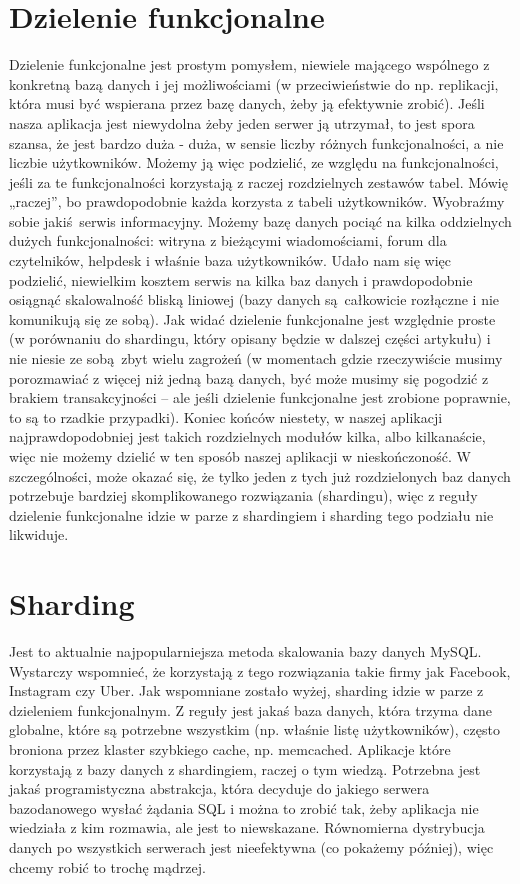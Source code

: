 \documentclass[a4paper,12pt]{article}
\begin{document}
\section{Dzielenie funkcjonalne}
Dzielenie funkcjonalne jest prostym pomysłem, niewiele mającego wspólnego z konkretną bazą danych i jej możliwościami (w przeciwieństwie do np. replikacji, która musi być wspierana przez bazę danych, żeby ją efektywnie zrobić). Jeśli nasza aplikacja jest niewydolna żeby jeden serwer ją utrzymał, to jest spora szansa, że jest bardzo duża - duża, w sensie liczby różnych funkcjonalności, a nie liczbie użytkowników. Możemy ją więc podzielić, ze względu na funkcjonalności, jeśli za te funkcjonalności korzystają z raczej rozdzielnych zestawów tabel. Mówię „raczej”, bo prawdopodobnie każda korzysta z tabeli użytkowników. Wyobraźmy sobie jakiś serwis informacyjny. Możemy bazę danych pociąć na kilka oddzielnych dużych funkcjonalności: witryna z bieżącymi wiadomościami, forum dla czytelników, helpdesk i właśnie baza użytkowników. Udało nam się więc podzielić, niewielkim kosztem serwis na kilka baz danych i prawdopodobnie osiągnąć  skalowalność bliską liniowej (bazy danych są całkowicie rozłączne i nie komunikują się ze sobą). Jak widać dzielenie funkcjonalne jest względnie proste (w porównaniu do shardingu, który opisany będzie w dalszej części artykułu) i nie niesie ze sobą zbyt wielu zagrożeń (w momentach gdzie rzeczywiście musimy porozmawiać z więcej niż jedną bazą danych, być może musimy się pogodzić z brakiem transakcyjności – ale jeśli dzielenie funkcjonalne jest zrobione poprawnie, to są to rzadkie przypadki). Koniec końców niestety, w naszej aplikacji najprawdopodobniej jest takich rozdzielnych modułów kilka, albo kilkanaście, więc nie możemy dzielić w ten sposób naszej aplikacji w nieskończoność. W szczególności, może okazać się, że tylko jeden z tych już rozdzielonych baz danych potrzebuje bardziej skomplikowanego rozwiązania (shardingu), więc z reguły dzielenie funkcjonalne idzie w parze z shardingiem i sharding tego podziału nie likwiduje.

\section{Sharding}
Jest to aktualnie najpopularniejsza metoda skalowania bazy danych MySQL. Wystarczy wspomnieć, że korzystają z tego rozwiązania takie firmy jak Facebook, Instagram czy Uber. Jak wspomniane zostało wyżej, sharding idzie w parze z dzieleniem funkcjonalnym. Z reguły jest jakaś baza danych, która trzyma dane globalne, które są potrzebne wszystkim (np. właśnie listę użytkowników), często broniona przez klaster szybkiego cache, np. memcached. Aplikacje które korzystają z bazy danych z shardingiem, raczej o tym wiedzą. Potrzebna jest jakaś programistyczna abstrakcja, która decyduje do jakiego serwera bazodanowego wysłać żądania SQL i można to zrobić tak, żeby aplikacja nie wiedziała z kim rozmawia, ale jest to niewskazane. Równomierna dystrybucja danych po wszystkich serwerach jest nieefektywna (co pokażemy później), więc chcemy robić to trochę mądrzej.
\end{document}

